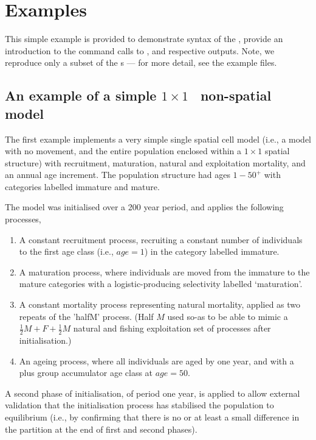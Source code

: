 
\section{Examples\label{sec:examples}}

This simple example is provided to demonstrate syntax of the \config, provide an introduction to the command calls to \SPM, and respective outputs. Note, we reproduce only a subset of the \config s --- for more detail, see the example files. 

\subsection{An example of a simple
  \texorpdfstring{$ 1 \times 1 $}{%
    1 x 1
  }%
\ non-spatial model\label{example1}} 

The first example implements a very simple single spatial cell model (i.e., a model with no movement, and the entire population enclosed within a $1 \times 1$ spatial structure) with recruitment, maturation, natural and exploitation mortality, and an annual age increment. The population structure had ages $1-50^{+}$ with categories labelled immature and mature. 

The model was initialised over a 200 year period, and applies the following processes,

\begin{enumerate}
\item A constant recruitment process, recruiting a constant number of individuals to the first age class (i.e., $age=1$) in the category labelled immature.
\item A maturation process, where individuals are moved from the immature to the mature categories with a logistic-producing selectivity labelled `maturation'.
\item A constant mortality process representing natural mortality, applied as two repeats of the 'halfM' process. (Half $M$ used so-as to be able to mimic a $\frac{1}{2} M + F + \frac{1}{2} M$ natural and fishing exploitation set of processes after initialisation.)
\item An ageing process, where all individuals are aged by one year, and with a plus group accumulator age class at $age=50$.
\end{enumerate}

A second phase of initialisation, of period one year, is applied to allow external validation that the initialisation process has stabilised the population to equilibrium (i.e., by confirming that there is no or at least a small difference in the partition at the end of first and second phases).

